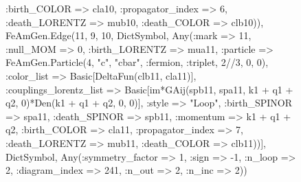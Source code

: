 \documentclass{revtex4}
\begin{document}
\begin{figure}[!htb]
\begin{center}
{:birth_COLOR => cla10, :propagator_index => 6, :death_LORENTZ => mub10, :death_COLOR => clb10)), FeAmGen.Edge(11, 9, 10, Dict{Symbol, Any}(:mark => 11, :null_MOM => 0, :birth_LORENTZ => mua11, :particle => FeAmGen.Particle(4, "c", "cbar", :fermion, :triplet, 2//3, 0, 0), :color_list => Basic[DeltaFun(clb11, cla11)], :couplings_lorentz_list => Basic[im*GAij(spb11, spa11, k1 + q1 + q2, 0)*Den(k1 + q1 + q2, 0, 0)], :style => "Loop", :birth_SPINOR => spa11, :death_SPINOR => spb11, :momentum => k1 + q1 + q2, :birth_COLOR => cla11, :propagator_index => 7, :death_LORENTZ => mub11, :death_COLOR => clb11))], Dict{Symbol, Any}(:symmetry_factor => 1, :sign => -1, :n_loop => 2, :diagram_index => 241, :n_out => 2, :n_inc => 2)) 
}
\end{center}
\end{figure}
\end{document}
